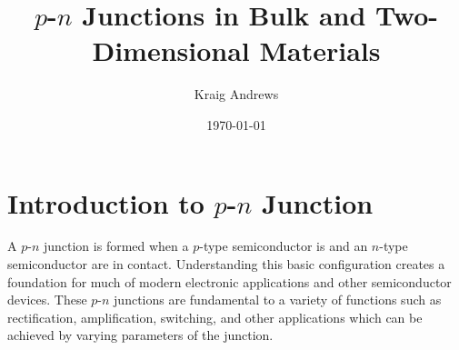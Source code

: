 \documentclass[%
 reprint,
 amsmath,amssymb,
 aps,
pra,
floatfix,
]{revtex4-1}
\begin{document}

\title{$p$-$n$ Junctions in Bulk and Two-Dimensional Materials}%

\author{Kraig Andrews}%
%




\date{\today}%

%	

\maketitle


\section{Introduction to $p$-$n$ Junction}\label{sec:sec001}
A $p$-$n$ junction is formed when a $p$-type semiconductor is and an $n$-type semiconductor are in contact.
Understanding this basic configuration creates a foundation for much of modern electronic
applications and other semiconductor devices. These $p$-$n$ junctions are fundamental to a variety of functions
such as rectification, amplification, switching, and other applications which can be achieved by varying parameters 
of the junction. 
\end{document}

